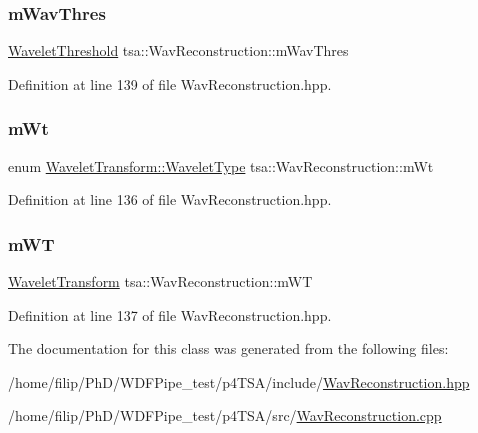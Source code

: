 \subsubsection{\texorpdfstring{m\+Wav\+Thres}{mWavThres}}
{\footnotesize\ttfamily \hyperlink{classtsa_1_1_wavelet_threshold}{Wavelet\+Threshold} tsa\+::\+Wav\+Reconstruction\+::m\+Wav\+Thres\hspace{0.3cm}{\ttfamily [private]}}



Definition at line 139 of file Wav\+Reconstruction.\+hpp.

\mbox{\label{classtsa_1_1_wav_reconstruction_ad97d775e3186bf6b642526359fa88580}} 
\subsubsection{\texorpdfstring{m\+Wt}{mWt}}
{\footnotesize\ttfamily enum \hyperlink{classtsa_1_1_wavelet_transform_a5a529de70e0004333fcf23b9cca88ce7}{Wavelet\+Transform\+::\+Wavelet\+Type} tsa\+::\+Wav\+Reconstruction\+::m\+Wt\hspace{0.3cm}{\ttfamily [private]}}



Definition at line 136 of file Wav\+Reconstruction.\+hpp.

\mbox{\label{classtsa_1_1_wav_reconstruction_a23f1a718111dd2028f82b954e85115b6}} 
\subsubsection{\texorpdfstring{m\+WT}{mWT}}
{\footnotesize\ttfamily \hyperlink{classtsa_1_1_wavelet_transform}{Wavelet\+Transform} tsa\+::\+Wav\+Reconstruction\+::m\+WT\hspace{0.3cm}{\ttfamily [private]}}



Definition at line 137 of file Wav\+Reconstruction.\+hpp.



The documentation for this class was generated from the following files\+:\begin{DoxyCompactItemize}
\item 
/home/filip/\+Ph\+D/\+W\+D\+F\+Pipe\+\_\+test/p4\+T\+S\+A/include/\hyperlink{_wav_reconstruction_8hpp}{Wav\+Reconstruction.\+hpp}\item 
/home/filip/\+Ph\+D/\+W\+D\+F\+Pipe\+\_\+test/p4\+T\+S\+A/src/\hyperlink{_wav_reconstruction_8cpp}{Wav\+Reconstruction.\+cpp}\end{DoxyCompactItemize}
